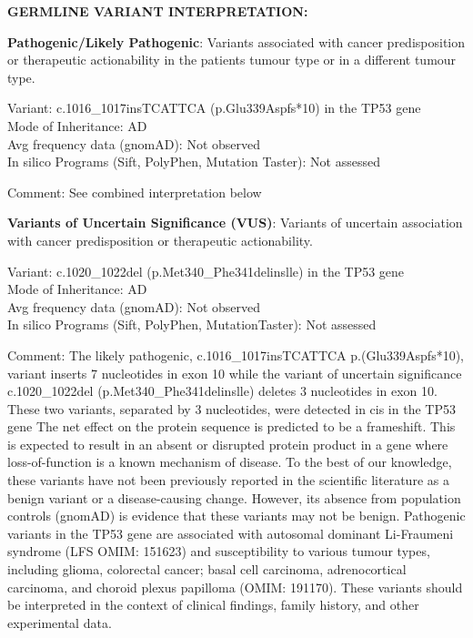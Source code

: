 \documentclass[8pt,letterpaper]{extarticle}
\begin{document}
{\bf \large GERMLINE VARIANT INTERPRETATION: }

{\bf Pathogenic/Likely Pathogenic}: Variants associated with cancer predisposition or therapeutic actionability in the patients tumour type or in a different tumour type.

Variant: c.1016\_1017insTCATTCA (p.Glu339Aspfs*10) in the TP53 gene \\
Mode of Inheritance: AD \\
Avg frequency data (gnomAD): Not observed \\
In silico Programs (Sift, PolyPhen, Mutation Taster): Not assessed

Comment: See combined interpretation below

\vspace{1em}
{\bf Variants of Uncertain Significance (VUS)}: Variants of uncertain association with cancer predisposition or therapeutic actionability.

Variant: c.1020\_1022del (p.Met340\_Phe341delinslle) in the TP53 gene \\
Mode of Inheritance: AD \\
Avg frequency data (gnomAD): Not observed \\
In silico Programs (Sift, PolyPhen, MutationTaster): Not assessed 

Comment: The likely pathogenic, c.1016\_1017insTCATTCA p.(Glu339Aspfs*10), variant inserts 7 nucleotides in exon 10 while the variant of uncertain significance c.1020\_1022del (p.Met340\_Phe341delinslle) deletes 3 nucleotides in exon 10. These two variants, separated by 3 nucleotides, were detected in cis in the TP53 gene The net effect on the protein sequence is predicted to be a frameshift. This is expected to result in an absent or disrupted protein product in a gene where loss-of-function is a known mechanism of disease. To the best of our knowledge, these variants have not been previously reported in the scientific literature as a benign variant or a disease-causing change. However, its absence from population controls (gnomAD) is evidence that these variants may not be benign. Pathogenic variants in the TP53 gene are associated with autosomal dominant Li-Fraumeni syndrome (LFS OMIM: 151623) and susceptibility to various tumour types, including glioma, colorectal cancer; basal cell carcinoma, adrenocortical carcinoma, and choroid plexus papilloma (OMIM: 191170). These variants should be interpreted in the context of clinical findings, family history, and other experimental data. 
\end{document}
